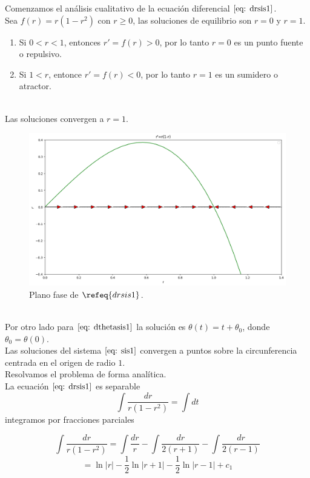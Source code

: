 \documentclass[12pt, a4paper]{report}
\begin{document}
Comenzamos el análisis cualitativo de la ecuación diferencial $\eqref{eq: drsis1}$.\\

Sea $f(r)=r(1-r^2)$ con $r\geq0$, las soluciones de equilibrio son $r=0$ y $r=1$.
\begin{enumerate}
	\item Si $0<r<1$, entonces $r'=f(r)>0$, por lo tanto $r=0$ es un punto fuente o repulsivo.
	\item Si $1<r$, entonce $r'=f(r)<0$, por lo tanto $r=1$ es un sumidero o atractor.
\end{enumerate}\\

Las soluciones convergen a $r=1$.
\begin{figure}[h]
	\centering
	\includegraphics[width=14cm]{rej1.png}
	\caption{Plano fase de $\refeq{drsis1}$.}
\end{figure}\\

Por otro lado para $\eqref{eq: dthetasis1}$ la solución es $\theta(t)=t+\theta_0$,
donde $\theta_0=\theta(0)$.\\

Las soluciones del sistema $\eqref{eq: sis1}$ convergen a puntos sobre la
circunferencia centrada en el origen de radio $1$.\\

Resolvamos el problema de forma analítica.\\

La ecuación $\eqref{eq: drsis1}$ es separable
$$\int\frac{dr}{r(1-r^2)}=\int dt$$
integramos por fracciones parciales

$$\int\frac{dr}{r(1-r^2)}=\int\frac{dr}{r}-\int\frac{dr}{2(r+1)}-\int\frac{dr}{2(r-1)}$$
$$=\ln |r|-\frac{1}{2}\ln|r+1|-\frac{1}{2}\ln|r-1|+c_1$$
\end{document}
